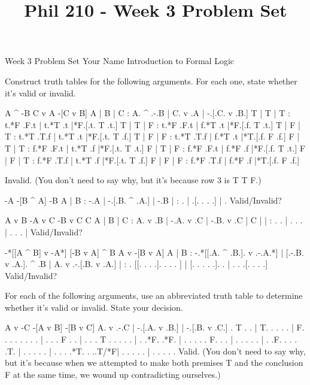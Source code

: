 
\title{Phil 210 - Week 3 Problem Set}

\heading
Week 3 Problem Set
Your Name
Introduction to Formal Logic
\endheading

Construct truth tables for the following arguments. For each one, state whether it's valid or invalid.

\problems
{}
\argument
 A ^ -B
 C v A
\argumentline
 -[C v B]
\endargument
        \answer
        \truthtable
         A | B | C : A. ^ .-.B | C. v .A | -.[.C. v .B.]
        \truthtableline
         T | T | T : t.*F .F.t | t.*T .t |*F.[.t. T .t.]
         T | T | F : t.*F .F.t | f.*T .t |*F.[.f. T .t.]
         T | F | T : t.*T .T.f | t.*T .t |*F.[.t. T .f.]
         T | F | F : t.*T .T.f | f.*T .t |*T.[.f. F .f.]
         F | T | T : f.*F .F.t | t.*T .f |*F.[.t. T .t.]
         F | T | F : f.*F .F.t | f.*F .f |*F.[.f. T .t.]
         F | F | T : f.*F .T.f | t.*T .f |*F.[.t. T .f.]
         F | F | F : f.*F .T.f | f.*F .f |*T.[.f. F .f.]
        \endtruthtable

        Invalid. (You don't need to say why, but it's because row 3 is T T F.)
        \endanswer

\argument
 -A
 -[B ^ A]
\argumentline
 -B
\endargument
        \answer
        \truthtable
         A | B : -.A | -.[.B. ^ .A.] | -.B
        \truthtableline
           |   :  .  |  .[. .   . .] |  . 
        \endtruthtable
        Valid/Invalid?
        \endanswer

\argument
 A v B
 -A v C
 -B v C
\argumentline
 C
\endargument
        \answer
        \truthtable
         A | B | C : A. v .B | -.A. v .C | -.B. v .C | C
        \truthtableline
           |   |   :  .   .  |  . .   .  |  . .   .  |  
        \endtruthtable
        Valid/Invalid?
        \endanswer

\argument
 -*[[A ^ B] v -A*]
 [-B v A] ^ B
\argumentline
 A v -[B v A]
\endargument
        \answer
        \truthtable
         A | B : -.*[[.A. ^ .B.]. v .-.A.*] | [.-.B. v .A.]. ^ .B | A. v .-.[.B. v .A.]
        \truthtableline
           |   :  . [[. .   . .].   . . . ] | [. . .   . .].   .  |  .   . .[. .   . .]
        \endtruthtable
        Valid/Invalid?
        \endanswer
\endproblems

For each of the following arguments, use an abbreviated truth table to determine whether it's valid or invalid. State your decision.

\problems
{}
\argument
 A v -C
 -[A v B]
\argumentline
 -[B v C]
\endargument
        \answer
        \truthtable
         A. v .-.C | -.[.A. v .B.] | -.[.B. v .C.]
        \truthtableline
          . T . .  | T. . .   . .  | F. . .   . .
          .   . .  |  . . . F . .  |  . . . T . .
          .   . .  |  . .*F.  .*F. |  . . .   . .
         F.   . .  |  . . .   . .  |  . .F.   . .
          .   .T.  |  . . .   . .  |  . . .   .*T.
          .  ..T/*F|  . . .   . .  |  . . .   . .
        \endtruthtable
        Valid. (You don't need to say why, but it's because when we attempted to make both premises T and the conclusion F at the same time, we wound up contradicting ourselves.)
        \endanswer

